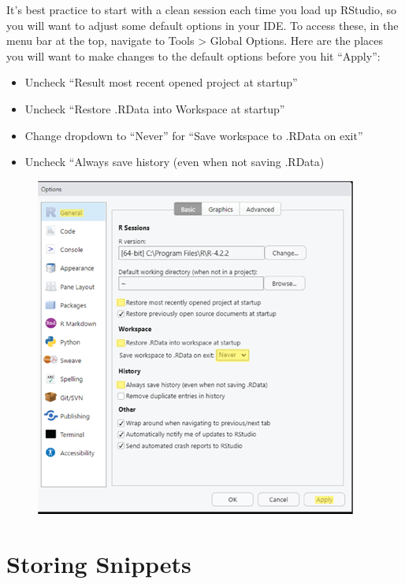 \documentclass[
  letterpaper,
  DIV=11,
  numbers=noendperiod]{scrreprt}
\providecommand{\tightlist}{%
  \setlength{\itemsep}{0pt}\setlength{\parskip}{0pt}}\usepackage{longtable,booktabs,array}
\begin{document}
It's best practice to start with a clean session each time you load up
RStudio, so you will want to adjust some default options in your IDE. To
access these, in the menu bar at the top, navigate to Tools
\textgreater{} Global Options. Here are the places you will want to make
changes to the default options before you hit ``Apply'':

\begin{itemize}
\tightlist
\item
  Uncheck ``Result most recent opened project at startup''
\item
  Uncheck ``Restore .RData into Workspace at startup''
\item
  Change dropdown to ``Never'' for ``Save workspace to .RData on exit''
\item
  Uncheck ``Always save history (even when not saving .RData)
\end{itemize}

\begin{figure}

{\centering \includegraphics{./images/r_setup-global-options.png}

}

\end{figure}

\hypertarget{storing-snippets}{%
\section{Storing Snippets}\label{storing-snippets}}
\end{document}
